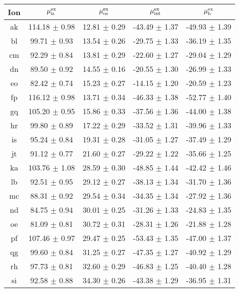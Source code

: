 \begin{table}
 \begin{center}
 \begin{tabular}{ccccc}
  \hline
  \hline
   Ion &   $\mu^{\mathrm{ex}}_{\mathrm{is}}$  &   $\mu^{\mathrm{ex}}_{\mathrm{os}}$  &   $\mu^{\mathrm{ex}}_{\mathrm{int}}$  &   $\mu^{\mathrm{ex}}_{\mathrm{b}}$  \\
  \hline
ak	&	114.18	$\pm$	0.98	&	12.81	$\pm$	0.29	&	-43.49	$\pm$	1.37	&	-49.93	$\pm$	1.39	\\
bl	&	99.71	$\pm$	0.93	&	13.54	$\pm$	0.26	&	-29.75	$\pm$	1.33	&	-36.19	$\pm$	1.35	\\
cm	&	92.29	$\pm$	0.84	&	13.81	$\pm$	0.29	&	-22.60	$\pm$	1.27	&	-29.04	$\pm$	1.29	\\
dn	&	89.50	$\pm$	0.92	&	14.55	$\pm$	0.16	&	-20.55	$\pm$	1.30	&	-26.99	$\pm$	1.33	\\
eo	&	82.42	$\pm$	0.74	&	15.23	$\pm$	0.27	&	-14.15	$\pm$	1.20	&	-20.59	$\pm$	1.23	\\
fp	&	116.12	$\pm$	0.98	&	13.71	$\pm$	0.34	&	-46.33	$\pm$	1.38	&	-52.77	$\pm$	1.40	\\
gq	&	105.20	$\pm$	0.95	&	15.86	$\pm$	0.33	&	-37.56	$\pm$	1.36	&	-44.00	$\pm$	1.38	\\
hr	&	99.80	$\pm$	0.89	&	17.22	$\pm$	0.29	&	-33.52	$\pm$	1.31	&	-39.96	$\pm$	1.33	\\
is	&	95.24	$\pm$	0.84	&	19.31	$\pm$	0.28	&	-31.05	$\pm$	1.27	&	-37.49	$\pm$	1.29	\\
jt	&	91.12	$\pm$	0.77	&	21.60	$\pm$	0.27	&	-29.22	$\pm$	1.22	&	-35.66	$\pm$	1.25	\\
ka	&	103.76	$\pm$	1.08	&	28.59	$\pm$	0.30	&	-48.85	$\pm$	1.44	&	-42.42	$\pm$	1.46	\\
lb	&	92.51	$\pm$	0.95	&	29.12	$\pm$	0.27	&	-38.13	$\pm$	1.34	&	-31.70	$\pm$	1.36	\\
mc	&	88.31	$\pm$	0.92	&	29.54	$\pm$	0.34	&	-34.35	$\pm$	1.34	&	-27.92	$\pm$	1.36	\\
nd	&	84.75	$\pm$	0.94	&	30.01	$\pm$	0.25	&	-31.26	$\pm$	1.33	&	-24.83	$\pm$	1.35	\\
oe	&	81.09	$\pm$	0.81	&	30.72	$\pm$	0.31	&	-28.31	$\pm$	1.26	&	-21.88	$\pm$	1.28	\\
pf	&	107.46	$\pm$	0.97	&	29.47	$\pm$	0.25	&	-53.43	$\pm$	1.35	&	-47.00	$\pm$	1.37	\\
qg	&	99.60	$\pm$	0.84	&	31.25	$\pm$	0.27	&	-47.35	$\pm$	1.27	&	-40.92	$\pm$	1.29	\\
rh	&	97.73	$\pm$	0.81	&	32.60	$\pm$	0.29	&	-46.83	$\pm$	1.25	&	-40.40	$\pm$	1.28	\\
si	&	92.58	$\pm$	0.88	&	34.30	$\pm$	0.26	&	-43.38	$\pm$	1.29	&	-36.95	$\pm$	1.31	\\

\end{tabular}
\end{center}
\end{table}
